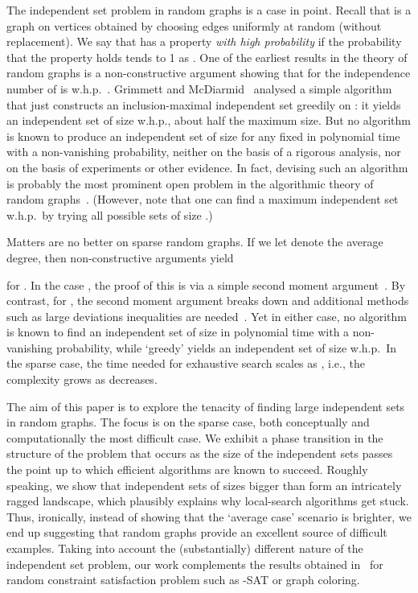 \documentclass[a4paper,10pt]{article}
\newcommand{\whp}{w.h.p.}
\begin{document}
The independent set problem in random graphs  is a case
in point. Recall that  is a graph on  vertices obtained
by choosing  edges uniformly at random (without replacement).
We say that  has a property \emph{with high probability}
if the probability that the property holds tends to 1 as .
One of the earliest results in the theory of random graphs is a
non-constructive argument showing that for 
the independence number of  is 
\whp~\cite{BollobasIS,erdos-1st,matula}. Grimmett and McDiarmid~\cite{grimmett}
analysed a simple algorithm that just constructs an inclusion-maximal
independent set greedily on : it yields an independent set
of size  \whp, about half the maximum size. But no
algorithm is known to produce an independent set of size  for any fixed  in polynomial time with a non-vanishing
probability, neither on the basis of a rigorous analysis, nor on
the basis of experiments or other evidence. In fact, devising such
an algorithm is probably the most prominent open problem in the
algorithmic theory of random graphs~\cite{friezeRSA,KarpOLD}. (However,
note that one can find a maximum independent set \whp\ by trying all
 possible sets of size .)


Matters are no better on sparse random graphs. If we let 
denote the average degree, then non-constructive arguments yield
	
for .
In the case , the proof of this is via a simple
second moment argument~\cite{BollobasIS,matula}. By contrast, for
, the second moment argument breaks down and
additional methods such as large deviations inequalities are 
needed~\cite{frieze-is}. Yet in either case, no algorithm is known
to find an independent set of size  in 
polynomial time with a non-vanishing probability, while `greedy' yields
an independent set of size  \whp\
In the sparse case, the time needed for exhaustive search scales
as , i.e., the complexity grows as
 decreases.


The aim of this paper is to explore the tenacity
of finding large independent sets in random graphs. The focus is on
the sparse case, both conceptually and computationally  the most
difficult case. We exhibit a phase transition in the structure of the
problem that occurs as the size of the independent sets passes the
point  up to which efficient algorithms are
known to succeed. Roughly speaking, we show that independent sets of
sizes bigger than  form an intricately
ragged landscape, which plausibly explains why local-search algorithms get
stuck. Thus, ironically, instead of showing that the `average case'
scenario is brighter, we end up suggesting that random graphs provide
an excellent source of difficult examples. Taking into account the (substantially)
different nature of the independent set problem, our work complements
the results obtained in~\cite{AchCoOg} for random constraint satisfaction
problem such as -SAT or graph coloring.
\end{document}
